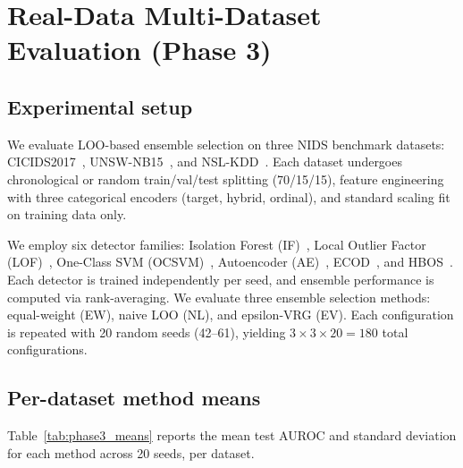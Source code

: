 \section{Real-Data Multi-Dataset Evaluation (Phase 3)}
\label{sec:phase3}

\subsection{Experimental setup}

We evaluate LOO-based ensemble selection on three NIDS benchmark datasets: CICIDS2017~\cite{mollmark2021nids}, UNSW-NB15~\cite{moustafa2015unsw}, and NSL-KDD~\cite{tavallaee2009nsl}. Each dataset undergoes chronological or random train/val/test splitting (70/15/15), feature engineering with three categorical encoders (target, hybrid, ordinal), and standard scaling fit on training data only.

We employ six detector families: Isolation Forest (IF)~\cite{liu2012isolation}, Local Outlier Factor (LOF)~\cite{breunig2000lof}, One-Class SVM (OCSVM)~\cite{scholkopf2001estimating}, Autoencoder (AE)~\cite{kingma2014autoencoding}, ECOD~\cite{li2019ecod}, and HBOS~\cite{aggarwal2015outlier}. Each detector is trained independently per seed, and ensemble performance is computed via rank-averaging. We evaluate three ensemble selection methods: equal-weight (EW), naive LOO (NL), and epsilon-VRG (EV). Each configuration is repeated with 20 random seeds (42--61), yielding $3 \times 3 \times 20 = 180$ total configurations.

\subsection{Per-dataset method means}

Table~\ref{tab:phase3_means} reports the mean test AUROC and standard deviation for each method across 20 seeds, per dataset.

